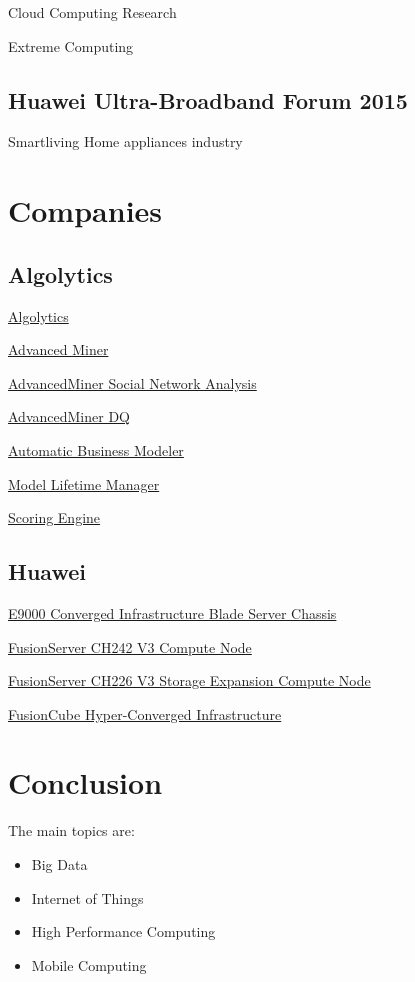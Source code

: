 \documentclass{report}
\begin{document}
Cloud Computing Research

Extreme Computing

\subsection{Huawei Ultra-Broadband Forum 2015}
Smartliving
Home appliances industry

\section{Companies}
\subsection{Algolytics}

\href{http://algolytics.com}{Algolytics}

\href{http://algolytics.com/products/advancedminer}{Advanced Miner}

\href{http://algolytics.com/products/advancedminer-sna}{AdvancedMiner Social Network Analysis}

\href{http://algolytics.com/products/advancedminer-dq}{AdvancedMiner DQ}

\href{http://algolytics.com/products/automatic-business-modeler}{Automatic Business Modeler}

\href{http://algolytics.com/products/model-lifetime-manager}{Model Lifetime Manager}

\href{http://algolytics.com/products/scoring-engine}{Scoring Engine}

\subsection{Huawei}
\href{http://e.huawei.com/en/products/cloud-computing-dc/servers/e-series/e9000-sever-chassis}{E9000 Converged Infrastructure Blade Server Chassis}

\href{http://e.huawei.com/en/products/cloud-computing-dc/servers/e-series/ch242-v3-node}{FusionServer CH242 V3 Compute Node}

\href{http://e.huawei.com/en/products/cloud-computing-dc/servers/e-series/ch226-v3-node}{FusionServer CH226 V3 Storage Expansion Compute Node}

\href{http://e.huawei.com/en/products/cloud-computing-dc/servers/fusioncube/fusioncube}{FusionCube Hyper-Converged Infrastructure}



\section{Conclusion}
The main topics are:
\begin{itemize}
\item Big Data
\item Internet of Things
\item High Performance Computing
\item Mobile Computing
\end{itemize}
\end{document}
